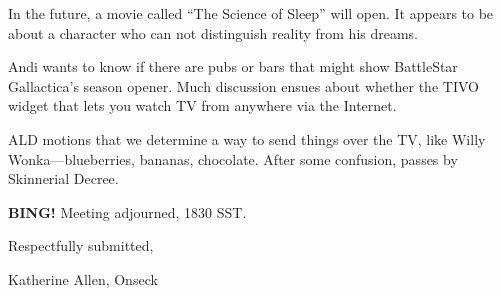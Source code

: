 \documentclass[10pt]{article}
\newcommand{\bing}{{\bf BING!} }
\begin{document}
In the future, a movie called ``The Science of Sleep'' will open. It
appears to be about a character who can not distinguish reality from
his dreams.

Andi wants to know if there are pubs or bars that might show
BattleStar Gallactica's season opener.  Much discussion ensues about
whether the TIVO widget that lets  you watch TV from anywhere via the
Internet.

ALD motions that we determine a way to send things over the TV, like
Willy Wonka---blueberries, bananas, chocolate.
After some confusion, passes by Skinnerial Decree.

\bing
\noindent
Meeting adjourned, 1830 SST.

\vspace{18pt}

\centerline{Respectfully submitted,}
\centerline{Katherine Allen, Onseck}
\end{document}

